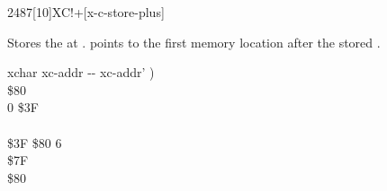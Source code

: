 \begin{worddef}{2487}[10]{XC!+}[x-c-store-plus]%
\item {}

	Stores the  at .  
	points to the first memory location after the stored .

	\begin{implement} %
	\word{:}   xchar xc-addr -{}- xc-addr' ) \\
	\tab {} \$80          \\
	\tab {} 0  \$3F \\
	\tab {}    \\
	\tab[2]    \$3F  \$80   6   \\
	\tab {} \$7F     \\
	\tab {}  \$80         \\
	\word{;}
	\end{implement}
\end{worddef}

